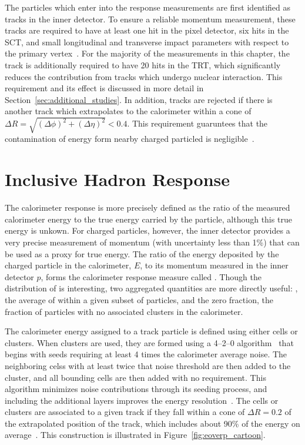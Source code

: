 The particles which enter into the response measurements are first identified as tracks in the inner detector.
To ensure a reliable momentum measurement, these tracks are required to have at least one hit in the pixel detector, six hits in the SCT, and small longitudinal and transverse impact parameters with respect to the primary vertex~\cite{PERF-2011-05}.
For the majority of the measurements in this chapter, the track is additionally required to have 20 hits in the TRT, which significantly reduces the contribution from tracks which undergo nuclear interaction.
This requirement and its effect is discussed in more detail in Section~\ref{sec:additional_studies}. 
In addition, tracks are rejected if there is another track which extrapolates to the calorimeter within a cone of $\Delta R = \sqrt{(\Delta\phi)^2 + (\Delta\eta)^2} < 0.4$.
This requirement guaruntees that the contamination of energy form nearby charged particled is negligible~\cite{PERF-2011-05}.


\section{Inclusive Hadron Response}
\label{sec:inclusive}

The calorimeter response is more precisely defined as the ratio of the measured calorimeter energy to the true energy carried by the particle, although this true energy is unkown. 
For charged particles, however, the inner detector provides a very precise measurement of momentum (with uncertainty less than 1\%) that can be used as a proxy for true energy.
The ratio of the energy deposited by the charged particle in the calorimeter, $E$, to its momentum measured in the inner detector $p$, forms the calorimeter response measure called \ep.
Though the distribution of \ep is interesting, two aggregated quantities are more directly useful: \epav, the average of \ep within a given subset of particles, and the zero fraction, the fraction of particles with no associated clusters in the calorimeter.

The calorimeter energy assigned to a track particle is defined using either cells or clusters. 
When clusters are used, they are formed using a 4--2--0 algorithm~\cite{TopoClusters} that begins with seeds requiring at least 4 times the calorimeter average noise. 
The neighboring celss with at least twice that noise threshold are then added to the cluster, and all bounding cells are then added with no requirement. 
This algorithm minimizes noise contributions through its seeding process, and including the additional layers improves the energy resolution~\cite{Speckmayer}.
The cells or clusters are associated to a given track if they fall within a cone of $\Delta R = 0.2$ of the extrapolated position of the track, which includes about 90\% of the energy on average~\cite{PERF-2011-05}.
This construction is illustrated in Figure~\ref{fig:eoverp_cartoon}.

